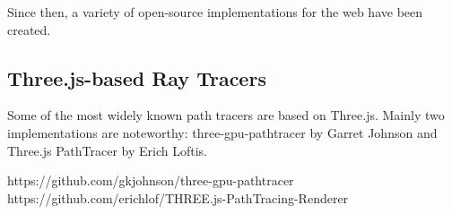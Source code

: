 Since then, a variety of open-source implementations for the web have been created.

\subsection{Three.js-based Ray Tracers}

Some of the most widely known path tracers are based on Three.js. Mainly two implementations are noteworthy: three-gpu-pathtracer by Garret Johnson and Three.js PathTracer by Erich Loftis.

https://github.com/gkjohnson/three-gpu-pathtracer
https://github.com/erichlof/THREE.js-PathTracing-Renderer

